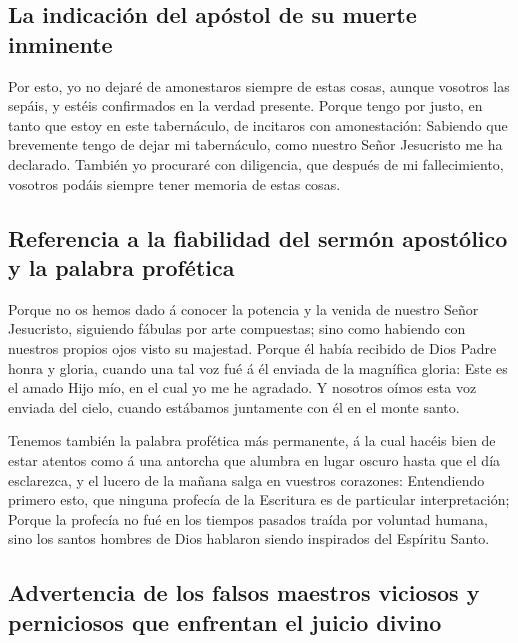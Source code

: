 \hypertarget{la-indicaciuxf3n-del-apuxf3stol-de-su-muerte-inminente}{%
\subsection{La indicación del apóstol de su muerte
inminente}\label{la-indicaciuxf3n-del-apuxf3stol-de-su-muerte-inminente}}

 Por esto, yo no dejaré de amonestaros siempre de estas
cosas, aunque vosotros las sepáis, y estéis confirmados en la verdad
presente.  Porque tengo por justo, en tanto que estoy en
este tabernáculo, de incitaros con amonestación: 
Sabiendo que brevemente tengo de dejar mi tabernáculo, como nuestro
Señor Jesucristo me ha declarado.  También yo procuraré
con diligencia, que después de mi fallecimiento, vosotros podáis siempre
tener memoria de estas cosas.

\hypertarget{referencia-a-la-fiabilidad-del-sermuxf3n-apostuxf3lico-y-la-palabra-profuxe9tica}{%
\subsection{Referencia a la fiabilidad del sermón apostólico y la
palabra
profética}\label{referencia-a-la-fiabilidad-del-sermuxf3n-apostuxf3lico-y-la-palabra-profuxe9tica}}

 Porque no os hemos dado á conocer la potencia y la
venida de nuestro Señor Jesucristo, siguiendo fábulas por arte
compuestas; sino como habiendo con nuestros propios ojos visto su
majestad.  Porque él había recibido de Dios Padre honra y
gloria, cuando una tal voz fué á él enviada de la magnífica gloria: Este
es el amado Hijo mío, en el cual yo me he agradado.  Y
nosotros oímos esta voz enviada del cielo, cuando estábamos juntamente
con él en el monte santo.

 Tenemos también la palabra profética más permanente, á
la cual hacéis bien de estar atentos como á una antorcha que alumbra en
lugar oscuro hasta que el día esclarezca, y el lucero de la mañana salga
en vuestros corazones:  Entendiendo primero esto, que
ninguna profecía de la Escritura es de particular interpretación;
 Porque la profecía no fué en los tiempos pasados traída
por voluntad humana, sino los santos hombres de Dios hablaron siendo
inspirados del Espíritu Santo.

\hypertarget{advertencia-de-los-falsos-maestros-viciosos-y-perniciosos-que-enfrentan-el-juicio-divino}{%
\subsection{Advertencia de los falsos maestros viciosos y perniciosos
que enfrentan el juicio
divino}\label{advertencia-de-los-falsos-maestros-viciosos-y-perniciosos-que-enfrentan-el-juicio-divino}}

